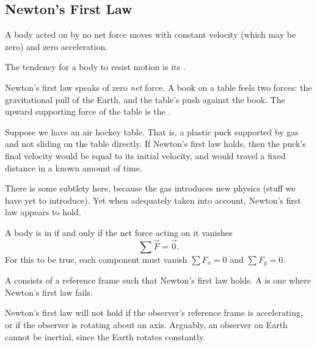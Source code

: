 \subsection{Newton's First Law}

\label{law:newton:first}
A body acted on by no net force moves with constant velocity
(which may be zero) and zero acceleration.

\begin{definition}
The tendency for a body to resist motion is its .
\end{definition}

\M
Newton's first law speaks of zero \emph{net} force. A book on a table
feels two forces: the gravitational pull of the Earth, and the table's
push against the book. The upward supporting force of the table is the
.

Suppose we have an air hockey table. That is, a plastic puck supported
by gas and not sliding on the table directly. If Newton's first law
holds, then the puck's final velocity would be equal to its initial
velocity, and would travel a fixed distance in a known amount of time.

There is some subtlety here, because the gas introduces new physics
(stuff we have yet to introduce). Yet when adequately taken into
account, Newton's first law appears to hold.

\begin{definition}
A body is in  if and only if the net force acting on
it vanishes
\begin{equation}
  \sum\vec{F} = \vec{0}.
\end{equation}
For this to be true, each component must vanish $\sum F_{x}=0$ and $\sum
F_{y}=0$.
\end{definition}

\begin{definition}\label{defn:newtonian-dynamics:inertial-reference-frame}
A  consists of a reference frame such
that Newton's first law holds. A 
is one where Newton's first law fails.
\end{definition}

\begin{remark}
Newton's first law will not hold if the observer's reference frame is
accelerating, or if the observer is rotating about an axis. Arguably, an
observer on Earth cannot be inertial, since the Earth rotates constantly.
\end{remark}

